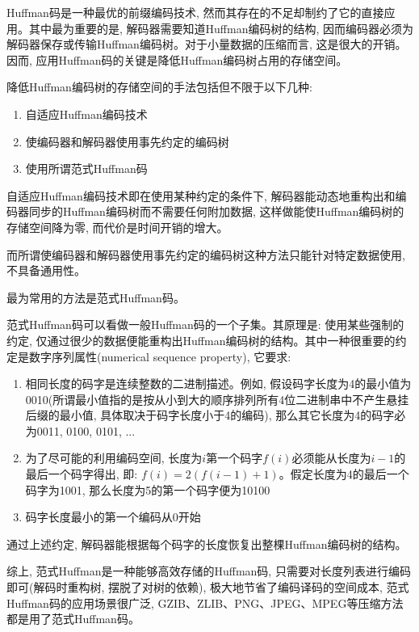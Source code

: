 \documentclass{article}
\begin{document}
\begin{CJK}{UTF8}{gbsn}
Huffman码是一种最优的前缀编码技术, 然而其存在的不足却制约了它的直接应用。其中最为重要的是, 解码器需要知道Huffman编码树的结构, 因而编码器必须为解码器保存或传输Huffman编码树。对于小量数据的压缩而言, 这是很大的开销。因而, 应用Huffman码的关键是降低Huffman编码树占用的存储空间。

降低Huffman编码树的存储空间的手法包括但不限于以下几种:

\begin{enumerate}
\def\labelenumi{\arabic{enumi}.}
\item
  自适应Huffman编码技术
\item
  使编码器和解码器使用事先约定的编码树
\item
  使用所谓范式Huffman码
\end{enumerate}

自适应Huffman编码技术即在使用某种约定的条件下, 解码器能动态地重构出和编码器同步的Huffman编码树而不需要任何附加数据, 这样做能使Huffman编码树的存储空间降为零, 而代价是时间开销的增大。

而所谓使编码器和解码器使用事先约定的编码树这种方法只能针对特定数据使用, 不具备通用性。

最为常用的方法是范式Huffman码。

范式Huffman码可以看做一般Huffman码的一个子集。其原理是: 使用某些强制的约定, 仅通过很少的数据便能重构出Huffman编码树的结构。其中一种很重要的约定是数字序列属性(numerical sequence property), 它要求:

\begin{enumerate}
\def\labelenumi{\arabic{enumi}.}
\item
  相同长度的码字是连续整数的二进制描述。例如, 假设码字长度为4的最小值为0010(所谓最小值指的是按从小到大的顺序排列所有4位二进制串中不产生悬挂后缀的最小值, 具体取决于码字长度小于4的编码), 那么其它长度为4的码字必为0011, 0100, 0101, ...
\item
  为了尽可能的利用编码空间, 长度为\(i\)第一个码字\(f(i)\)必须能从长度为\(i-1\)的最后一个码字得出, 即: \(f(i) = 2(f(i-1)+1)\)。假定长度为4的最后一个码字为1001, 那么长度为5的第一个码字便为10100
\item
  码字长度最小的第一个编码从0开始
\end{enumerate}

通过上述约定, 解码器能根据每个码字的长度恢复出整棵Huffman编码树的结构。

综上, 范式Huffman是一种能够高效存储的Huffman码, 只需要对长度列表进行编码即可(解码时重构树, 摆脱了对树的依赖), 极大地节省了编码译码的空间成本, 范式Huffman码的应用场景很广泛, GZIB、ZLIB、PNG、JPEG、MPEG等压缩方法都是用了范式Huffman码。


\end{CJK}
\end{document}
